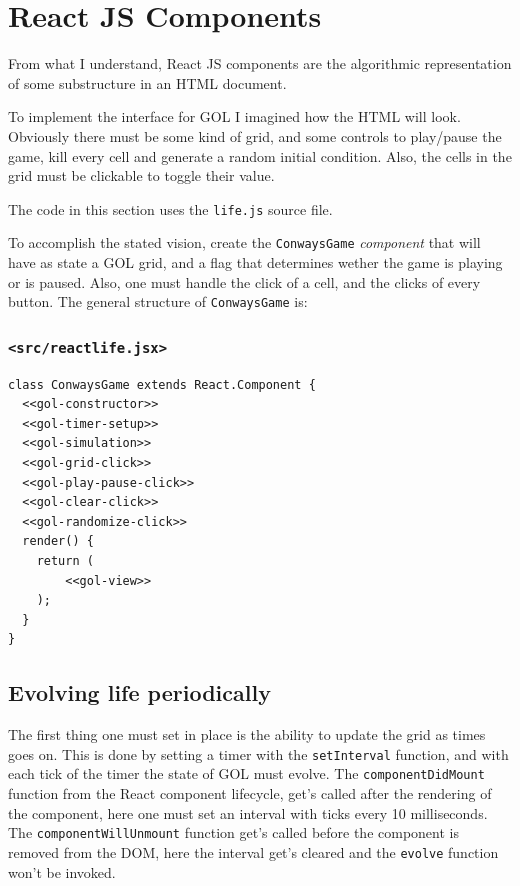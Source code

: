 \documentclass[11pt]{article}
\begin{document}
\section{React JS Components}
\label{sec:orgb9dbcf2}

From what I understand, React JS components are the algorithmic representation of some substructure in an HTML document.

To implement the interface for GOL I imagined how the HTML will look. Obviously there must be some kind of grid, and some controls to play/pause the game, kill every cell and generate a random initial condition. Also, the cells in the grid must be clickable to toggle their value.

The code in this section uses the \texttt{life.js} source file.

To accomplish the stated vision, create the \texttt{ConwaysGame} \emph{component} that will have as state a GOL grid, and a flag that determines wether the game is playing or is paused. Also, one must handle the click of a cell, and the clicks of every button. The general structure of \texttt{ConwaysGame} is:

\subsubsection{\texttt{<src/reactlife.jsx>}}
\label{sec:orgdc3d876}
\begin{verbatim}
class ConwaysGame extends React.Component {
  <<gol-constructor>>
  <<gol-timer-setup>>
  <<gol-simulation>>
  <<gol-grid-click>>
  <<gol-play-pause-click>>
  <<gol-clear-click>>
  <<gol-randomize-click>>
  render() { 
    return (
        <<gol-view>>
    );
  }
}
\end{verbatim}

\subsection{Evolving life periodically}
\label{sec:org07719b8}

The first thing one must set in place is the ability to update the grid as times goes on. This is done by setting a timer with the \texttt{setInterval} function, and with each tick of the timer the state of GOL must evolve. The \texttt{componentDidMount} function from the React component lifecycle, get's called after the rendering of the component, here one must set an interval with ticks every 10 milliseconds. The \texttt{componentWillUnmount} function get's called before the component is removed from the DOM, here the interval get's cleared and the \texttt{evolve} function won't be invoked.
\end{document}
